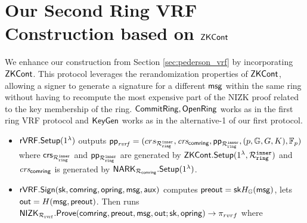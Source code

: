 
\section{Our Second Ring VRF Construction based on $ \ZKCont $}

\label{subsec:rvrf_faster}
We enhance our construction from Section \ref{sec:pederson_vrf} by incorporating $ \ZKCont $. This protocol leverages the rerandomization properties of $ \ZKCont $, allowing a signer to generate a signature for a different $ \msg $ within the same ring without having to recompute the most expensive part of the NIZK proof related to the key membership of the ring. $\CommitRing, \OpenRing $ works as in the first ring VRF protocol and $ \KeyGen$ works as in the alternative-1 of our first protocol.
\begin{itemize}
	\item $ \rVRF.\Setup(1^\secparam)   $ outputs $ \pprvrf = (crs_{\relinner}, \crsnark,  \pp_{\relinner}, (p, \grE,\genG, \genB), \F_p) $ where $ \crs_{\relinner}$ and $\pp_{\relinner} $ are generated by $ \ZKCont.\Setup(1^\secparam, \relinner) $ and $ \crsnark $ is generated by $ \NARK_{\relcomring}.\Setup(1^\secparam) $.
	
	\item $\rVRF.\rSign(\sk,\comring, \openring,\msg,\aux) $ computes $ \PreOut = \sk H_\grE(\msg) $, lets $ \Out = H(\msg, \PreOut) $. Then runs $ \NIZK_{\relrvrf}.\Prove(\comring,\PreOut, \msg, \Out; \sk,\openring)\rightarrow \pi_{rvrf}$ where
	

\end{itemize}
